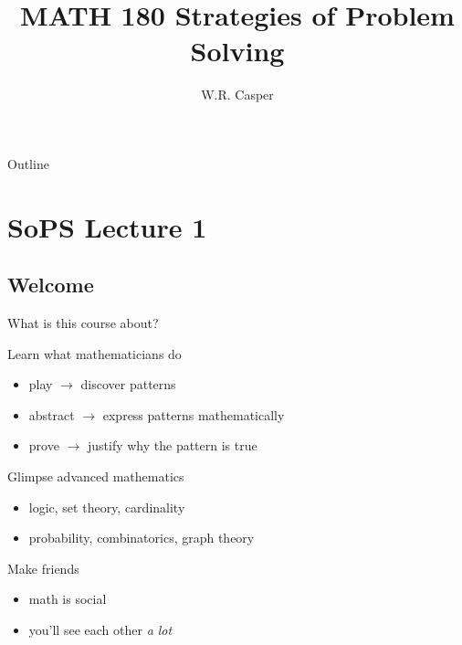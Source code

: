 \documentclass{beamer}
\title{MATH 180 Strategies of Problem Solving}
\subtitle
{} %
\author[W.R. Casper] %
{W.R. Casper}
\institute[California State University Fullerton] %
{
  Department of Mathematics\\
  California State University Fullerton}
\begin{document}
\begin{frame}
  \titlepage
\end{frame}

\begin{frame}{Outline}
  \tableofcontents
\end{frame}



\section{SoPS Lecture 1}
\subsection{Welcome}

\begin{frame}{What is this course about?}
\pause
  \begin{block}{Learn what mathematicians do}
    \begin{itemize}
\pause
      \item play $\rightarrow$ discover patterns
\pause
      \item abstract $\rightarrow$ express patterns mathematically
\pause
      \item prove $\rightarrow$ justify why the pattern is true
    \end{itemize}
  \end{block}
\pause
  \begin{block}{Glimpse advanced mathematics}
    \begin{itemize}
\pause
      \item logic, set theory, cardinality
\pause
      \item probability, combinatorics, graph theory
    \end{itemize}
  \end{block}
\pause
  \begin{block}{Make friends}
    \begin{itemize}
\pause
      \item math is {\color{red}social}
\pause
      \item you'll see each other \emph{a lot}
    \end{itemize}
  \end{block}
\end{frame}
\end{document}
